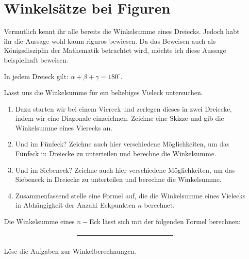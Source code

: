 \documentclass[11pt,oneside]{article}
\begin{document}
\section{Winkelsätze bei Figuren}
	Vermutlich kennt ihr alle bereits die Winkelsumme eines Dreiecks. Jedoch habt ihr die Aussage wohl kaum riguros bewiesen. Da das Beweisen auch als Königsdisziplin der Mathematik betrachtet wird, möchte ich diese Aussage beispielhaft beweisen.
	\begin{satz}
		In jedem Dreieck gilt: $\alpha+\beta+\gamma=180^\circ$.
	\end{satz}
	\begin{beweis}
	\end{beweis}
	Lasst uns die Winkelsumme für ein beliebiges Vieleck untersuchen.
	\begin{aufgabe}
		\begin{enumerate}[label=\alph*)]
			\item Dazu starten wir bei einem Viereck und zerlegen dieses in zwei Dreiecke, indem wir eine Diagonale einzeichnen. Zeichne eine Skizze und gib die Winkelsumme eines Vierecks an.
		\end{enumerate}
		\begin{enumerate}[label=\alph*)]\setcounter{enumi}{1}
			\item Und im Fünfeck? Zeichne auch hier verschiedene Möglichkeiten, um das Fünfeck in Dreiecke zu unterteilen und berechne die Winkelsumme.
		\end{enumerate}
		\begin{enumerate}[label=\alph*)]\setcounter{enumi}{2}
			\item Und im Siebeneck? Zeichne auch hier verschiedene Möglichkeiten, um das Siebeneck in Dreiecke zu unterteilen und berechne die Winkelsumme.
		\end{enumerate}
		\begin{enumerate}[label=\alph*)]\setcounter{enumi}{3}
			\item Zusammenfassend stelle eine Formel auf, die die Winkelsumme eines Vielecks in Abhängigkeit der Anzahl Eckpunkten $n$ berechnet.
		\end{enumerate}
	\end{aufgabe}
	\begin{satz}
		Die Winkelsumme eines $n-$Eck lässt sich mit der folgenden Formel berechnen:\[\gap{5}.\]
	\end{satz}
	\begin{aufgabe}
		Löse die Aufgaben zur Winkelberechnungen.
	\end{aufgabe}
\end{document}
